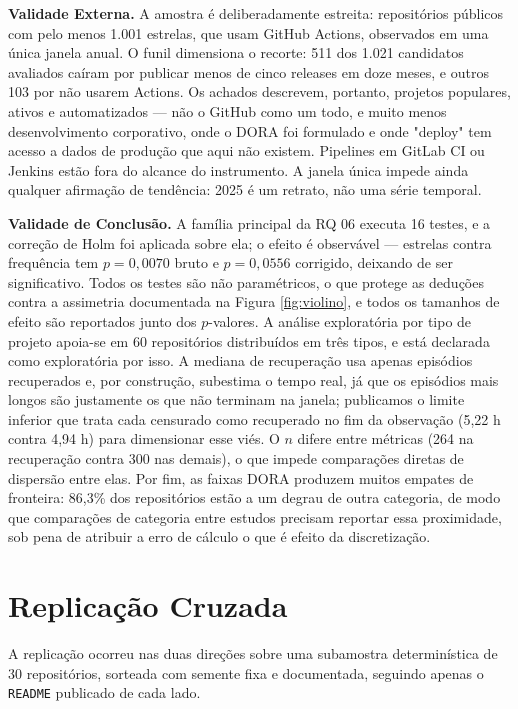 \documentclass[12pt]{article}
\begin{document}
\textbf{Validade Externa.} A amostra é deliberadamente estreita: repositórios públicos com
pelo menos 1.001 estrelas, que usam GitHub Actions, observados em uma única janela anual. O
funil dimensiona o recorte: 511 dos 1.021 candidatos avaliados caíram por publicar menos de
cinco releases em doze meses, e outros 103 por não usarem Actions. Os achados descrevem,
portanto, projetos populares, ativos e automatizados --- não o GitHub como um todo, e muito
menos desenvolvimento corporativo, onde o DORA foi formulado e onde "deploy" tem acesso a
dados de produção que aqui não existem. Pipelines em GitLab CI ou Jenkins estão fora do
alcance do instrumento. A janela única impede ainda qualquer afirmação de tendência: 2025 é
um retrato, não uma série temporal.

\textbf{Validade de Conclusão.} A família principal da RQ 06 executa 16 testes, e a correção
de Holm foi aplicada sobre ela; o efeito é observável --- estrelas contra frequência tem
$p = 0{,}0070$ bruto e $p = 0{,}0556$ corrigido, deixando de ser significativo. Todos os
testes são não paramétricos, o que protege as deduções contra a assimetria documentada na
Figura \ref{fig:violino}, e todos os tamanhos de efeito são reportados junto dos $p$-valores.
A análise exploratória por tipo de projeto apoia-se em 60 repositórios distribuídos em três
tipos, e está declarada como exploratória por isso. A mediana de recuperação usa apenas
episódios recuperados e, por construção, subestima o tempo real, já que os episódios mais
longos são justamente os que não terminam na janela; publicamos o limite inferior que trata
cada censurado como recuperado no fim da observação (5,22 h contra 4,94 h) para dimensionar
esse viés. O $n$ difere entre métricas (264 na recuperação contra 300 nas demais), o que
impede comparações diretas de dispersão entre elas. Por fim, as faixas DORA produzem muitos
empates de fronteira: 86,3\% dos repositórios estão a um degrau de outra categoria, de modo
que comparações de categoria entre estudos precisam reportar essa proximidade, sob pena de
atribuir a erro de cálculo o que é efeito da discretização.

\section{Replicação Cruzada}
\label{sec:replicacao}

A replicação ocorreu nas duas direções sobre uma subamostra determinística de 30
repositórios, sorteada com semente fixa e documentada, seguindo apenas o \texttt{README}
publicado de cada lado.
\end{document}
